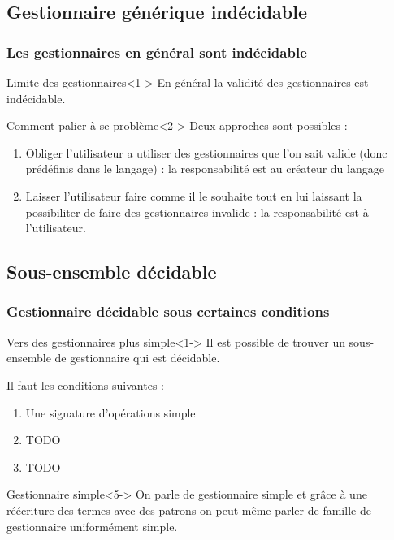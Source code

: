 \documentclass{beamer}
\begin{document}
\subsection{Gestionnaire générique indécidable}
\begin{frame}
	\frametitle{Les gestionnaires en général sont indécidable}
	\begin{block}{Limite des gestionnaires}<1->
		En général la validité des gestionnaires est \alert{indécidable}.
	\end{block}

	\begin{block}{Comment palier à se problème}<2->
		Deux approches sont possibles : 
		\begin{enumerate}
			\item Obliger l'utilisateur a utiliser des gestionnaires que l'on sait valide (donc prédéfinis dans le langage) : \alert{la responsabilité est au créateur du langage}
			\item Laisser l'utilisateur faire comme il le souhaite tout en lui laissant la possibiliter de faire des gestionnaires
			invalide : \alert{la responsabilité est à l'utilisateur}.
		\end{enumerate}
	\end{block}
\end{frame}

\subsection{Sous-ensemble décidable}
\begin{frame}
	\frametitle{Gestionnaire décidable sous certaines conditions}
	\begin{block}{Vers des gestionnaires plus simple}<1->
		Il est possible de trouver un sous-ensemble de gestionnaire qui est \alert{décidable}.
		
		\pause\bigbreak

		Il faut les conditions suivantes : 
		\begin{enumerate}
			\item<2-> Une signature d'opérations \alert{simple}
			\item<3-> TODO
			\item<4-> TODO
		\end{enumerate}
	\end{block}

	\begin{block}{Gestionnaire simple}<5->
		On parle de \alert{gestionnaire simple} et grâce à une réécriture des termes avec des 
		patrons on peut même parler de \alert{famille de gestionnaire uniformément simple}.
	\end{block}
\end{frame}
\end{document}
